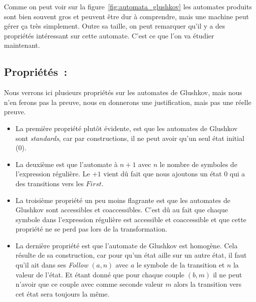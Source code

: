 \vphantom{}

Comme on peut voir sur la figure~\ref{fig:automata_glushkov} les automates
produits sont bien souvent gros et peuvent être dur à comprendre, mais une
machine peut gérer ça très simplement. Outre sa taille, on peut remarquer qu'il
y a des propriétés intéressant sur cette automate. C'est ce que l'on va étudier
maintenant.

\subsection{Propriétés~:}

Nous verrons ici plusieurs propriétés sur les automates de Glushkov, mais nous
n'en ferons pas la preuve, nous en donnerons une justification, mais pas une
réelle preuve.

\vphantom{}

\begin{itemize}[label=\textbullet]
    \item La première propriété plut\^{o}t évidente, est que les automates de Glushkov
          sont \textit{standards}, car par constructions, il ne peut avoir qu'un seul
          état initial (0).

          \vphantom{}

    \item La deuxième est que l'automate à \(n + 1\) avec \(n\) le nombre de symboles de
          l'expression régulière. Le \(+ 1\) vient dû fait que nous ajoutons un état
          \(0\) qui a des transitions vers les \(First\).

          \vphantom{}

    \item La troisième propriété un peu moins flagrante est que les automates de Glushkov
          sont accessibles et coaccessibles. C'est dû au fait que chaque symbole dans
          l'expression régulière est accessible et coaccessible et que cette propriété ne
          se perd pas lors de la transformation.

          \vphantom{}

    \item La dernière propriété est que l'automate de Glushkov est homogène. Cela résulte
          de sa construction, car pour qu'un état aille sur un autre état, il faut qu'il
          ait dans ses \textit{Follow} \((a, n)\) avec \(a\) le symbole de la transition
          et \(n\) la valeur de l'état. Et étant donné que pour chaque couple \((b, m)\)
          il ne peut n'avoir que ce couple avec comme seconde valeur \(m\) alors la
          transition vers cet état sera toujours la même.
\end{itemize}

